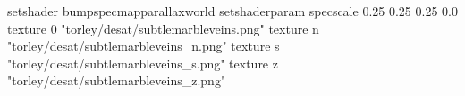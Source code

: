 setshader bumpspecmapparallaxworld
setshaderparam specscale 0.25 0.25 0.25 0.0
texture 0 "torley/desat/subtlemarbleveins.png"
texture n "torley/desat/subtlemarbleveins_n.png"
texture s "torley/desat/subtlemarbleveins_s.png"
texture z "torley/desat/subtlemarbleveins_z.png"

